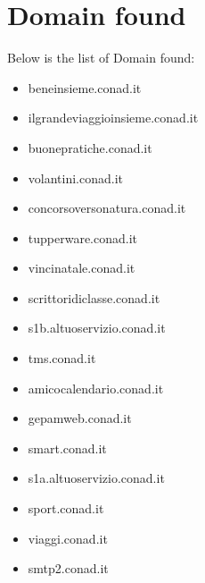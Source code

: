 \documentclass{article}
\begin{document}
\clearpage

\section{Domain found}

Below is the list of Domain found:

\begin{itemize}
    
        
            \item beneinsieme.conad.it
        
            \item ilgrandeviaggioinsieme.conad.it
        
            \item buonepratiche.conad.it
        
            \item volantini.conad.it
        
            \item concorsoversonatura.conad.it
        
            \item tupperware.conad.it
        
            \item vincinatale.conad.it
        
            \item scrittoridiclasse.conad.it
        
            \item s1b.altuoservizio.conad.it
        
            \item tms.conad.it
        
            \item amicocalendario.conad.it
        
            \item gepamweb.conad.it
        
            \item smart.conad.it
        
            \item s1a.altuoservizio.conad.it
        
            \item sport.conad.it
        
            \item viaggi.conad.it
        
            \item smtp2.conad.it
        

\end{itemize}
\end{document}
